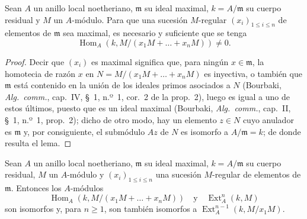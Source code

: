 \begin{lemma}[16.4.2]
\label{0.16.4.2-es}
Sean $A$ un anillo local noetheriano, $\mathfrak{m}$ su ideal maximal,
$k=A/\mathfrak{m}$ su cuerpo residual y $M$ un $A$-módulo. Para que una
sucesión $M$-regular $(x_i)_{1\leq i\leq n}$ de elementos de $\mathfrak{m}$
sea maximal, es necesario y suficiente que se tenga
\[
  \operatorname{Hom}_A(k,M/(x_1M+\ldots+x_nM))\neq0.
\]
\end{lemma}

\begin{proof}
Decir que $(x_i)$ es maximal significa que, para ningún $x\in\mathfrak{m}$,
la homotecia de razón $x$ en $N=M/(x_1M+\ldots+x_nM)$ es inyectiva, o también
que $\mathfrak{m}$ está contenido en la unión de los ideales primos asociados
a $N$ (Bourbaki, \emph{Alg.~comm.}, cap.~IV, \S~1, n.º~1, cor.~2 de la
prop.~2), luego es igual a uno de estos últimos, puesto que es un ideal
maximal (Bourbaki, \emph{Alg.~comm.}, cap.~II, \S~1, n.º~1, prop.~2); dicho de
otro modo, hay un elemento $z\in N$ cuyo anulador es $\mathfrak{m}$ y, por
consiguiente, el submódulo $Az$ de $N$ es isomorfo a
$A/\mathfrak{m}=k$; de donde resulta el lema.
\end{proof}

\begin{lemma}[16.4.3]
\label{0.16.4.3-es}
Sean $A$ un anillo local noetheriano, $\mathfrak{m}$ su ideal maximal,
$k=A/\mathfrak{m}$ su cuerpo residual, $M$ un $A$-módulo y
$(x_i)_{1\leq i\leq n}$ una sucesión $M$-regular de elementos de
$\mathfrak{m}$. Entonces los $A$-módulos
\[
  \operatorname{Hom}_A(k,M/(x_1M+\ldots+x_nM))
  \quad\text{y}\quad \operatorname{Ext}^n_A(k,M)
\]
son isomorfos y, para $n\geq1$, son también isomorfos a
$\operatorname{Ext}^{n-1}_A(k,M/x_1M)$.
\end{lemma}

